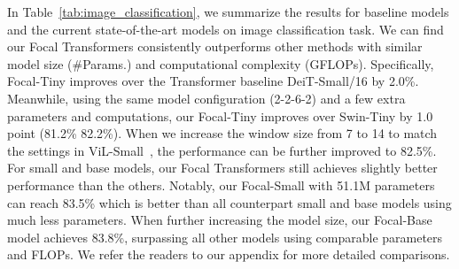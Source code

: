 \documentclass{article}
\begin{document}
In Table~\ref{tab:image_classification}, we summarize the results for baseline models and the current state-of-the-art models on image classification task. We can find our Focal Transformers consistently outperforms other methods with similar model size (\#Params.) and computational complexity (GFLOPs). Specifically, Focal-Tiny improves over the Transformer baseline DeiT-Small/16 by 2.0\%. Meanwhile, using the same model configuration (2-2-6-2) and a few extra parameters and computations, our Focal-Tiny improves over Swin-Tiny by 1.0 point (81.2\%  82.2\%). When we increase the window size from 7 to 14 to match the settings in ViL-Small~\cite{zhang2021multi}, the performance can be further improved to 82.5\%. For small and base models, our Focal Transformers still achieves slightly better performance than the others. Notably, our Focal-Small with 51.1M parameters can reach 83.5\% which is better than all counterpart small and base models using much less parameters. When further increasing the model size, our Focal-Base model achieves 83.8\%, surpassing all other models using comparable parameters and FLOPs. We refer the readers to our appendix for more detailed comparisons.
\end{document}
